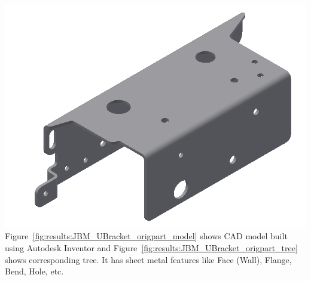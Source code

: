 
\begin{minipage}{\linewidth}
\begin{minipage}[c]{0.62\linewidth}
\includegraphics[width=\linewidth,valign=t]{images/JBM_UBracket_origpart_model}
 \label{fig:results:JBM_UBracket_origpart_model}
Figure~\ref{fig:results:JBM_UBracket_origpart_model} shows CAD model built using Autodesk Inventor and Figure~\ref{fig:results:JBM_UBracket_origpart_tree} shows corresponding tree. It has sheet metal features like Face (Wall), Flange, Bend, Hole, etc.
\end{minipage}
\quad
\begin{minipage}[c]{0.3\linewidth}

\end{minipage}
\end{minipage}
